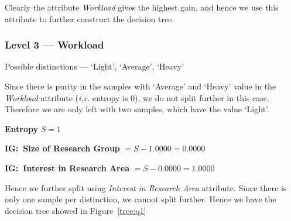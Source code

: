 \documentclass[a4paper,11pt]{article}
\begin{document}
\begin{mlsolution}
\begin{addmargin}{1.5em}
\begin{addmargin}{1.5em}
            Clearly the attribute \textit{Workload} gives the highest gain, and hence we use this attribute to further construct the decision tree.
            
        \end{addmargin}

        \subsubsection{Level 3 --- Workload}
        \begin{addmargin}{1.5em}

            Possible distinctions --- `Light', `Average', `Heavy' \br%

            Since there is purity in the samples with `Average' and `Heavy' value in the \textit{Workload} attribute (\textit{i.e.} entropy is 0), we do not split further in this case. Therefore we are only left with two samples, which have the value `Light'. \br%

            \textbf{Entropy} $S = 1$ \br%

            \textbf{IG:\ Size of Research Group} $ = S - 1.0000 = 0.0000$

            \textbf{IG:\ Interest in Research Area} $ = S - 0.0000 = 1.0000$ \br%

            Hence we further split using \textit{Interest in Research Area} attribute. Since there is only one sample per distinction, we cannot split further. Hence we have the decision tree showed in Figure~\ref{tree:q1}

        \end{addmargin}

    \end{addmargin}

\end{mlsolution}

\begin{mlsolution}
    
\end{mlsolution}
\end{document}
